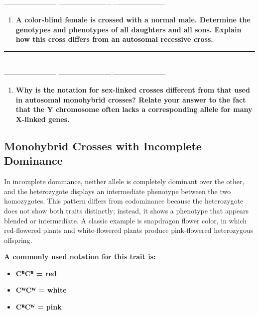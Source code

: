 \documentclass[
  letterpaper,
  DIV=11,
  numbers=noendperiod]{scrreprt}
\providecommand{\tightlist}{%
  \setlength{\itemsep}{0pt}\setlength{\parskip}{0pt}}
\begin{document}
\textbf{~~}\\
----------------------- ----------------------- -----------------------

\begin{enumerate}
\def\labelenumi{\arabic{enumi}.}
\setcounter{enumi}{5}
\tightlist
\item
  \textbf{A color-blind female is crossed with a normal male. Determine
  the genotypes and phenotypes of all daughters and all sons. Explain
  how this cross differs from an autosomal recessive cross.}
\end{enumerate}

\begin{center}\rule{0.5\linewidth}{0.5pt}\end{center}

\textbf{~~}\\
----------------------- ----------------------- -----------------------

\begin{enumerate}
\def\labelenumi{\arabic{enumi}.}
\setcounter{enumi}{6}
\tightlist
\item
  \textbf{Why is the notation for sex-linked crosses different from that
  used in autosomal monohybrid crosses? Relate your answer to the fact
  that the Y chromosome often lacks a corresponding allele for many
  X-linked genes.}
\end{enumerate}

\subsection{\texorpdfstring{\textbf{Monohybrid Crosses with Incomplete
Dominance}}{Monohybrid Crosses with Incomplete Dominance}}\label{monohybrid-crosses-with-incomplete-dominance}

In incomplete dominance, neither allele is completely dominant over the
other, and the heterozygote displays an intermediate phenotype between
the two homozygotes. This pattern differs from codominance because the
heterozygote does not show both traits distinctly; instead, it shows a
phenotype that appears blended or intermediate. A classic example is
snapdragon flower color, in which red-flowered plants and white-flowered
plants produce pink-flowered heterozygous offspring.

\textbf{A commonly used notation for this trait is:}

\begin{itemize}
\item
  \textbf{CᴿCᴿ = red}
\item
  \textbf{CᵂCᵂ = white}
\item
  \textbf{CᴿCᵂ = pink}
\end{itemize}
\end{document}

